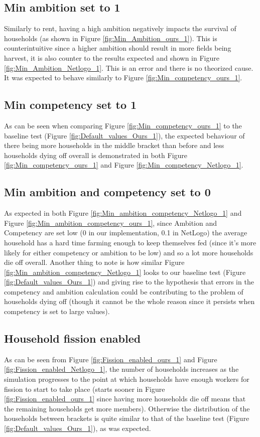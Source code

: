 \documentclass[12pt]{article}
\begin{document}
			\subsection{Min ambition set to 1}
				Similarly to rent, having a high ambition negatively impacts the survival of households (as shown in Figure \ref{fig:Min_Ambition_ours_1}). This is counterintuitive since a higher ambition should result in more fields being harvest, it is also counter to the results expected and shown in Figure \ref{fig:Min_Ambition_Netlogo_1}. This is an error and there is no theorized cause.\\
				It was expected to behave similarly to Figure \ref{fig:Min_competency_ours_1}.\\

			\subsection{Min competency set to 1}		
				As can be seen when comparing Figure \ref{fig:Min_competency_ours_1} to the baseline test (Figure \ref{fig:Default_values_Ours_1}), the expected behaviour of there being more households in the middle bracket than before and less households dying off overall is demonstrated in both Figure \ref{fig:Min_competency_ours_1} and Figure \ref{fig:Min_competency_Netlogo_1}. 
			
			\subsection{Min ambition and competency set to 0}
				As expected in both Figure \ref{fig:Min_ambition_competency_Netlogo_1} and Figure \ref{fig:Min_ambition_competency_ours_1}, since Ambition and Competency are set low (0 in our implementation, 0.1 in NetLogo) the average household has a hard time farming enough to keep themselves fed (since it’s more likely for either competency or ambition to be low) and so a lot more households die off overall. Another thing to note is how similar Figure \ref{fig:Min_ambition_competency_Netlogo_1} looks to our baseline test (Figure \ref{fig:Default_values_Ours_1}) and giving rise to the hypothesis that errors in the competency and ambition calculation could be contributing to the problem of households dying off (though it cannot be the whole reason since it persists when competency is set to large values).
			
			\subsection{Household fission enabled}			
				As can be seen from Figure \ref{fig:Fission_enabled_ours_1} and Figure \ref{fig:Fission_enabled_Netlogo_1}, the number of households increases as the simulation progresses to the point at which households have enough workers for fission to start to take place (starts sooner in Figure \ref{fig:Fission_enabled_ours_1} since having more households die off means that the remaining households get more members). Otherwise the distribution of the households between brackets is quite similar to that of the baseline test (Figure \ref{fig:Default_values_Ours_1}), as was expected.
			
\end{document}
